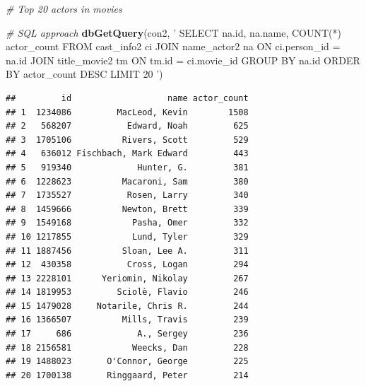 \documentclass[]{article}
\newenvironment{Shaded}{\begin{snugshade}}{\end{snugshade}}
\newcommand{\KeywordTok}[1]{\textcolor[rgb]{0.13,0.29,0.53}{\textbf{{#1}}}}
\newcommand{\DataTypeTok}[1]{\textcolor[rgb]{0.13,0.29,0.53}{{#1}}}
\newcommand{\DecValTok}[1]{\textcolor[rgb]{0.00,0.00,0.81}{{#1}}}
\newcommand{\StringTok}[1]{\textcolor[rgb]{0.31,0.60,0.02}{{#1}}}
\newcommand{\CommentTok}[1]{\textcolor[rgb]{0.56,0.35,0.01}{\textit{{#1}}}}
\newcommand{\NormalTok}[1]{{#1}}
\begin{document}
\begin{Shaded}
\begin{Highlighting}[]
\CommentTok{# Top 20 actors in movies}

\CommentTok{# SQL approach}
\KeywordTok{dbGetQuery}\NormalTok{(con2, }\StringTok{'}
\StringTok{           SELECT na.id, na.name, COUNT(*) actor_count}
\StringTok{           FROM cast_info2 ci JOIN name_actor2 na ON ci.person_id = na.id}
\StringTok{              JOIN title_movie2 tm ON tm.id = ci.movie_id}
\StringTok{           GROUP BY na.id}
\StringTok{           ORDER BY actor_count DESC}
\StringTok{           LIMIT 20}
\StringTok{           '}\NormalTok{)}
\end{Highlighting}
\end{Shaded}

\begin{verbatim}
##         id                   name actor_count
## 1  1234086         MacLeod, Kevin        1508
## 2   568207           Edward, Noah         625
## 3  1705106          Rivers, Scott         529
## 4   636012 Fischbach, Mark Edward         443
## 5   919340             Hunter, G.         381
## 6  1228623          Macaroni, Sam         380
## 7  1735527           Rosen, Larry         340
## 8  1459666          Newton, Brett         339
## 9  1549168            Pasha, Omer         332
## 10 1217855            Lund, Tyler         329
## 11 1887456          Sloan, Lee A.         311
## 12  430358           Cross, Logan         294
## 13 2228101      Yeriomin, Nikolay         267
## 14 1819953         Sciolè, Flavio         246
## 15 1479028     Notarile, Chris R.         244
## 16 1366507          Mills, Travis         239
## 17     686             A., Sergey         236
## 18 2156581            Weecks, Dan         228
## 19 1488023       O'Connor, George         225
## 20 1700138       Ringgaard, Peter         214
\end{verbatim}

\begin{Shaded}
\end{Shaded}
\end{document}
